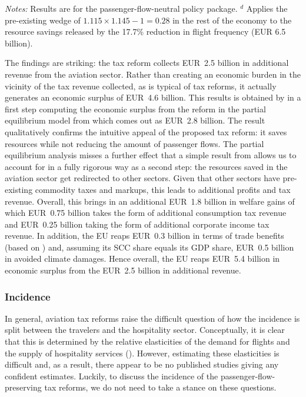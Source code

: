 \documentclass[../../main]{subfiles}
\begin{document}
\begin{table}[htbp]
\vspace{0.5em}
\begin{minipage}{\textwidth}
\footnotesize
\textit{Notes:} Results are for the passenger-flow-neutral policy package.
$^{d}$ Applies the pre-existing wedge of $1.115\times1.145-1=0.28$ in the rest of the economy to the resource savings released by the 17.7\% reduction in flight frequency (EUR 6.5 billion). %
\end{minipage}
\end{table}

The findings are striking: the tax reform collects EUR~2.5 billion in additional revenue from the aviation sector. Rather than creating an economic burden in the vicinity of the tax revenue collected, as is typical of tax reforms, it actually generates an economic surplus of EUR~4.6 billion. This results is obtained by in a first step computing the economic surplus from the reform in the partial equilibrium model from \cite{Dörpinghaus_et_al_2026} which comes out as EUR~2.8 billion. The result qualitatively confirms the intuitive appeal of the proposed tax reform: it saves resources while not reducing the amount of passenger flows. The partial equilibrium analysis misses a further effect that a simple result from \citet{stern2026wedges} allows us to account for in a fully rigorous way as a second step: the resources saved in the aviation sector get redirected to other sectors. Given that other sectors have pre-existing commodity taxes and markups, this leads to additional profits and tax revenue. Overall, this brings in an additional EUR~1.8 billion in welfare gains of which EUR~0.75 billion takes the form of additional consumption tax revenue and EUR~0.25 billion taking the form of additional corporate income tax revenue. In addition, the EU reaps EUR~0.3 billion in terms of trade benefits (based on \citet{beaufils2025geopolitical}) and, assuming its SCC share equals its GDP share, EUR~0.5 billion in avoided climate damages. Hence overall, the EU reaps EUR~5.4 billion in economic surplus from the EUR~2.5 billion in additional revenue. 


\subsubsection{Incidence}
In general, aviation tax reforms raise the difficult question of how the incidence is split between the travelers and the hospitality sector. Conceptually, it is clear that this is determined by the relative elasticities of the demand for flights and the supply of hospitality services (\citet{black2024destination}). However, estimating these elasticities is difficult and, as a result, there appear to be no published studies giving any confident estimates. %
Luckily, to discuss the incidence of the passenger-flow-preserving tax reforms, we do not need to take a stance on these questions.
\end{document}
